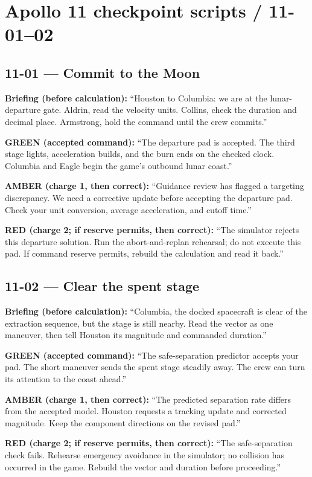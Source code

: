 \newcommand{\NarrationCard}[6]{%
  \subsection*{#1 --- #2}
  \textbf{Briefing (before calculation):} ``#3''\par
  \textbf{GREEN (accepted command):} ``#4''\par
  \textbf{AMBER (charge 1, then correct):} ``#5''\par
  \textbf{RED (charge 2; if reserve permits, then correct):} ``#6''\par}

\clearpage
\section*{Apollo 11 checkpoint scripts / 11-01--02}
\NarrationCard{11-01}{Commit to the Moon}
{Houston to Columbia: we are at the lunar-departure gate.
Aldrin, read the velocity units. Collins, check the duration and
decimal place. Armstrong, hold the command until the crew commits.}
{The departure pad is accepted. The third stage lights, acceleration
builds, and the burn ends on the checked clock.
Columbia and Eagle begin the game's outbound lunar coast.}
{Guidance review has flagged a targeting discrepancy.
We need a corrective update before accepting the departure pad.
Check your unit conversion, average acceleration, and cutoff time.}
{The simulator rejects this departure solution.
Run the abort-and-replan rehearsal; do not execute this pad.
If command reserve permits, rebuild the calculation and read it back.}

\NarrationCard{11-02}{Clear the spent stage}
{Columbia, the docked spacecraft is clear of the extraction sequence,
but the stage is still nearby. Read the vector as one maneuver,
then tell Houston its magnitude and commanded duration.}
{The safe-separation predictor accepts your pad.
The short maneuver sends the spent stage steadily away.
The crew can turn its attention to the coast ahead.}
{The predicted separation rate differs from the accepted model.
Houston requests a tracking update and corrected magnitude.
Keep the component directions on the revised pad.}
{The safe-separation check fails. Rehearse emergency avoidance in
the simulator; no collision has occurred in the game.
Rebuild the vector and duration before proceeding.}

\clearpage
